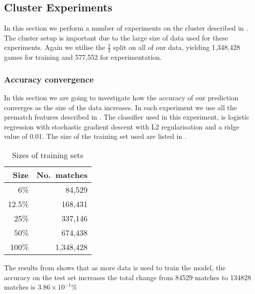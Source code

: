 \subsection{Cluster Experiments}\label{sec:clustertest}
In this section we perform a number of experiments on the cluster described in . The cluster setup is important due to the large size of data used for these experiments. Again we utilise the $\frac{2}{3}$ split on all of our data, yielding 1,348,428 games for training and 577,552 for experimentation.

\subsubsection{Accuracy convergence}
In this section we are going to investigate how the accuracy of our prediction converges as the size of the data increases. In each experiment we use all the prematch features described in . The classifier used in this experiment, is logistic regression with stochastic gradient descent with L2 regularisation and a ridge value of 0.01. The size of the training set used are listed in .

\begin{table}[!htb]
  \centering
  \begin{tabular}{|r|r|}
    \hline
    Size   & No.\ matches \\\hline
    6\%    & 84,529\\
    12.5\% & 168,431\\  
    25\%   & 337,146\\  
    50\%   & 674,438\\ 
    100\%  & 1,348,428\\\hline
  \end{tabular}
  \caption{Sizes of training sets}\label{tab:trainingsize}
\end{table}

The results from  shows that as more data is used to train the model, the accuracy on the test set increases the total change from 84529 matches to 134828 matches is $3.86\times10^{-1}\%$

